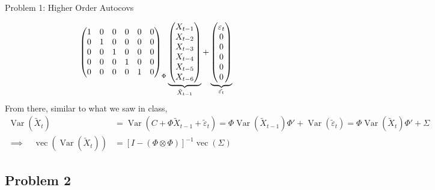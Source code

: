 \documentclass[handout]{beamer}
\newcommand{\vc}{\operatorname{vec}}
\newcommand{\Var}{\operatorname{Var}}
\begin{document}
\begin{frame}[shrink]{Problem 1: Higher Order Autocovs}
\begin{itemize}
\begin{align*}
{\begin{pmatrix}
          1 & 0 & 0 & 0 & 0 & 0 \\
          0 & 1 & 0 & 0 & 0 & 0 \\
          0 & 0 & 1 & 0 & 0 & 0 \\
          0 & 0 & 0 & 1 & 0 & 0 \\
          0 & 0 & 0 & 0 & 1 & 0 \\
        \end{pmatrix}
      }_{\Phi}
      \underbrace{%
        \begin{pmatrix}
          X_{t-1} \\
          X_{t-2} \\
          X_{t-3} \\
          X_{t-4} \\
          X_{t-5} \\
          X_{t-6} \\
        \end{pmatrix}
      }_{\tilde{X}_{t-1}}
      +
      \underbrace{%
        \begin{pmatrix}
          \varepsilon_t \\
          0 \\
          0 \\
          0 \\
          0 \\
          0 \\
        \end{pmatrix}
      }_{\tilde{\varepsilon_t}}
    \end{align*}
    From there, similar to what we saw in class,
    \begin{align*}
      \Var(\tilde{X}_t)
      &=
      \Var(C + \Phi \tilde{X}_{t-1}+ \tilde{\varepsilon}_t)
      =
      \Phi \Var(\tilde{X}_{t-1})\Phi'
      +
      \Var(\tilde{\varepsilon}_t)
      =
      \Phi \Var(\tilde{X}_{t})\Phi'
      + \Sigma
      \\
      \implies\quad
      \vc(\Var(\tilde{X}_t))
      &=
      [I-(\Phi\otimes\Phi)]^{-1}
      \vc(\Sigma)
    \end{align*}
\end{itemize}
\end{frame}


\subsection{Problem 2}
\end{document}
